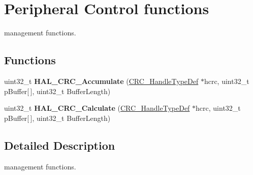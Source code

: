 \hypertarget{group___c_r_c___exported___functions___group2}{}\section{Peripheral Control functions}
\label{group___c_r_c___exported___functions___group2}


management functions.  


\subsection*{Functions}
\begin{DoxyCompactItemize}
\item 
\mbox{\label{group___c_r_c___exported___functions___group2_ga124a77d595e4982ad6e9a64c22f28b7b}} 
uint32\+\_\+t {\bfseries H\+A\+L\+\_\+\+C\+R\+C\+\_\+\+Accumulate} (\hyperlink{struct_c_r_c___handle_type_def}{C\+R\+C\+\_\+\+Handle\+Type\+Def} $\ast$hcrc, uint32\+\_\+t p\+Buffer\mbox{[}$\,$\mbox{]}, uint32\+\_\+t Buffer\+Length)
\item 
\mbox{\label{group___c_r_c___exported___functions___group2_ga298593a6fb0bbd109cdbed3851806371}} 
uint32\+\_\+t {\bfseries H\+A\+L\+\_\+\+C\+R\+C\+\_\+\+Calculate} (\hyperlink{struct_c_r_c___handle_type_def}{C\+R\+C\+\_\+\+Handle\+Type\+Def} $\ast$hcrc, uint32\+\_\+t p\+Buffer\mbox{[}$\,$\mbox{]}, uint32\+\_\+t Buffer\+Length)
\end{DoxyCompactItemize}


\subsection{Detailed Description}
management functions. 

